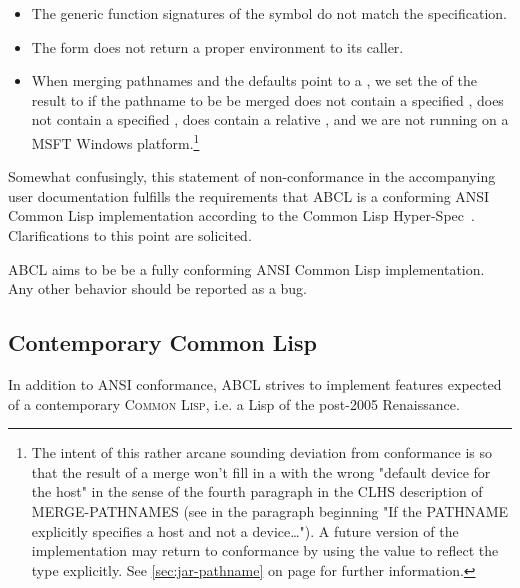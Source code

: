 \documentclass[10pt]{book}
\begin{document}
\begin{itemize}
\item The generic function signatures of the 
  symbol do not match the specification.
\item The  form does not return a proper
   environment to its caller.
\item When merging pathnames and the defaults point to a
  , we set the  of the result to
   if the pathname to be be merged does not contain
  a specified , does not contain a specified ,
  does contain a relative , and we are not running on
  a \textsc{MSFT} Windows platform.\footnote{The intent of this rather
  arcane sounding deviation from conformance is so that the result of
  a merge won't fill in a  with the wrong "default device
  for the host" in the sense of the fourth paragraph in the
  \textsc{CLHS} description of MERGE-PATHNAMES (see in \cite{CLHS} the
  paragraph beginning "If the PATHNAME explicitly specifies a host and
  not a device…").  A future version of the implementation may return
  to conformance by using the  value to reflect the type
  explicitly. See \ref{sec:jar-pathname} on page
  \pageref{sec:jar-pathname} for further information.}

\end{itemize}

Somewhat confusingly, this statement of non-conformance in the
accompanying user documentation fulfills the requirements that
\textsc{ABCL} is a conforming ANSI Common Lisp implementation according
to the Common Lisp Hyper-Spec~\cite{CLHS}.  Clarifications to this point
are solicited.

\textsc{ABCL} aims to be be a fully conforming \textsc{ANSI} Common
Lisp implementation.  Any other behavior should be reported as a bug.

\subsection{Contemporary Common Lisp}
In addition to \textsc{ANSI} conformance, \textsc{ABCL} strives to implement
features expected of a contemporary \textsc{Common Lisp}, i.e. a Lisp of the
post-2005 Renaissance.
\end{document}

